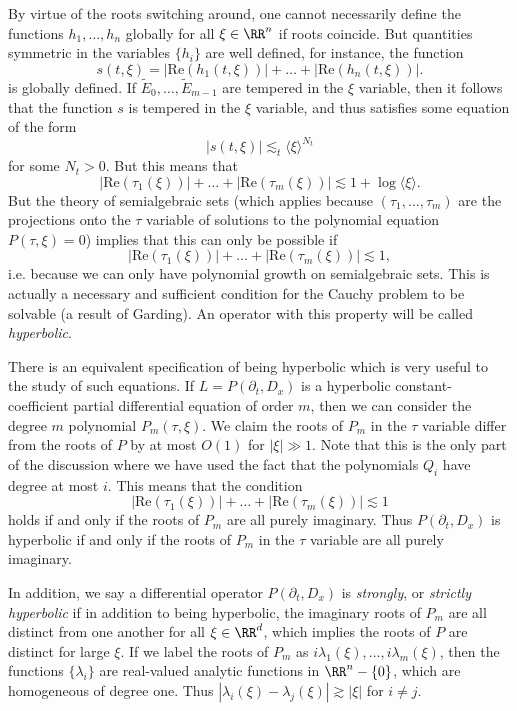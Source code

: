 By virtue of the roots switching around, one cannot necessarily define the functions $h_1,\dots,h_n$ globally for all $\xi \in \RR^n$ if roots coincide. But quantities symmetric in the variables $\{ h_i \}$ are well defined, for instance, the function
%
\[ s(t,\xi) = |\text{Re}(h_1(t,\xi))| + \dots + |\text{Re}(h_n(t,\xi))|. \]
%
is globally defined. If $\tilde{E}_0,\dots,\tilde{E}_{m-1}$ are tempered in the $\xi$ variable, then it follows that the function $s$ is tempered in the $\xi$ variable, and thus satisfies some equation of the form
%
\[ |s(t,\xi)| \lesssim_t \langle \xi \rangle^{N_t} \]
%
for some $N_t > 0$. But this means that
%
\[ |\text{Re}(\tau_1(\xi))| + \dots + |\text{Re}(\tau_m(\xi))| \lesssim 1 + \log \langle \xi \rangle. \]
%
But the theory of semialgebraic sets (which applies because $(\tau_1,\dots,\tau_m)$ are the projections onto the $\tau$ variable of solutions to the polynomial equation $P(\tau,\xi) = 0$) implies that this can only be possible if
%
\[ |\text{Re}(\tau_1(\xi))| + \dots + |\text{Re}(\tau_m(\xi))| \lesssim 1, \]
%
i.e. because we can only have polynomial growth on semialgebraic sets. This is actually a necessary and sufficient condition for the Cauchy problem to be solvable (a result of Garding). An operator with this property will be called \emph{hyperbolic}.

There is an equivalent specification of being hyperbolic which is very useful to the study of such equations. If $L = P(\partial_t, D_x)$ is a hyperbolic constant-coefficient partial differential equation of order $m$, then we can consider the degree $m$ polynomial $P_m(\tau,\xi)$. We claim the roots of $P_m$ in the $\tau$ variable differ from the roots of $P$ by at most $O(1)$ for $|\xi| \gg 1$. Note that this is the only part of the discussion where we have used the fact that the polynomials $Q_i$ have degree at most $i$. This means that the condition
%
\[ |\text{Re}(\tau_1(\xi))| + \dots + |\text{Re}(\tau_m(\xi))| \lesssim 1 \]
%
holds if and only if the roots of $P_m$ are all purely imaginary. Thus $P(\partial_t, D_x)$ is hyperbolic if and only if the roots of $P_m$ in the $\tau$ variable are all purely imaginary.

In addition, we say a differential operator $P(\partial_t, D_x)$ is \emph{strongly}, or \emph{strictly hyperbolic} if in addition to being hyperbolic, the imaginary roots of $P_m$ are all distinct from one another for all $\xi \in \RR^d$, which implies the roots of $P$ are distinct for large $\xi$. If we label the roots of $P_m$ as $i \lambda_1(\xi), \dots, i \lambda_m(\xi)$, then the functions $\{ \lambda_i \}$ are real-valued analytic functions in $\RR^n - \{ 0 \}$, which are homogeneous of degree one. Thus $|\lambda_i(\xi) - \lambda_j(\xi)| \gtrsim |\xi|$ for $i \neq j$.

